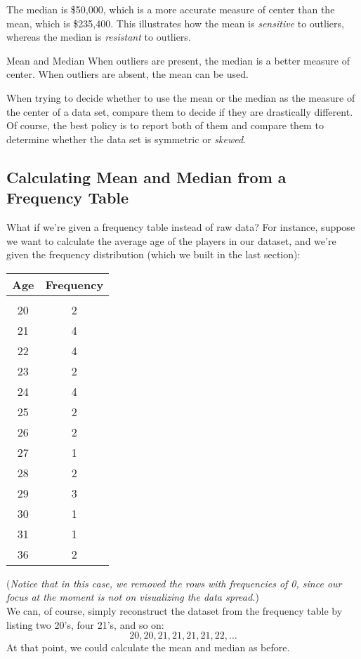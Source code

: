The median is \$50,000, which is a more accurate measure of center than the mean, which is \$235,400. This illustrates how the mean is \textit{sensitive} to outliers, whereas the median is \textit{resistant} to outliers. 

\begin{proc}{Mean and Median}
When outliers are present, the median is a better measure of center. When outliers are absent, the mean can be used.
\end{proc}

When trying to decide whether to use the mean or the median as the measure of the center of a data set, compare them to decide if they are drastically different.  Of course, the best policy is to report both of them and compare them to determine whether the data set is symmetric or \textit{skewed}.

\subsection{Calculating Mean and Median from a Frequency Table}
What if we're given a frequency table instead of raw data?  For instance, suppose we want to calculate the average age of the players in our dataset, and we're given the frequency distribution (which we built in the last section):
\begin{center}
\begin{tabular}{c c}
\textbf{Age} & \textbf{Frequency}\\
\hline
& \\
20 & 2\\
21 & 4\\
22 & 4\\
23 & 2\\
24 & 4\\
25 & 2\\
26 & 2\\
27 & 1\\
28 & 2\\
29 & 3\\
30 & 1\\
31 & 1\\
36 & 2
\end{tabular}
\end{center}
(\emph{Notice that in this case, we removed the rows with frequencies of 0, since our focus at the moment is not on visualizing the data spread.})\\

We can, of course, simply reconstruct the dataset from the frequency table by listing two 20's, four 21's, and so on:
\[20, 20, 21, 21, 21, 21, 22, \ldots\]
At that point, we could calculate the mean and median as before.
\pagebreak

